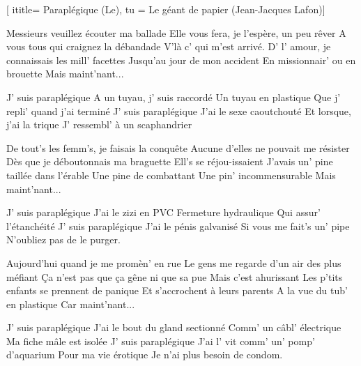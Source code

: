  [
ititle= {Paraplégique (Le)},
tu = {Le géant de papier (Jean-Jacques Lafon)}]


\beginverse
Messieurs veuillez écouter ma ballade
Elle vous fera, je l'espère, un peu rêver
A vous tous qui craignez la débandade
V'là c' qui m'est arrivé.
D' l' amour, je connaissais les mill' facettes
Jusqu'au jour de mon accident
En missionnair' ou en brouette
Mais maint'nant...
\endverse

\beginverse
J' suis paraplégique
A un tuyau, j' suis raccordé
Un tuyau en plastique
Que j' repli' quand j'ai terminé
J' suis paraplégique
J'ai le sexe caoutchouté
Et lorsque, j'ai la trique
J' ressembl' à un scaphandrier
\endverse

\beginverse
De tout's les femm's, je faisais la conquête
Aucune d'elles ne pouvait me résister
Dès que je déboutonnais ma braguette
Ell's se réjou-issaient
J'avais un' pine taillée dans l'érable
Une pine de combattant
Une pin' incommensurable
Mais maint'nant...
\endverse

\beginverse
J' suis paraplégique
J'ai le zizi en PVC
Fermeture hydraulique
Qui assur' l'étanchéité
J' suis paraplégique
J'ai le pénis galvanisé
Si vous me fait's un' pipe
N'oubliez pas de le purger.
\endverse

\beginverse
Aujourd'hui quand je me promèn' en rue
Le gens me regarde d'un air des plus méfiant
Ça n'est pas que ça gêne ni que sa pue
Mais c'est ahurissant
Les p'tits enfants se prennent de panique
Et s'accrochent à leurs parents
A la vue du tub' en plastique
Car maint'nant...
\endverse

\beginverse
J' suis paraplégique
J'ai le bout du gland sectionné
Comm' un câbl' électrique
Ma fiche mâle est isolée
J' suis paraplégique
J'ai l' vit comm' un' pomp' d'aquarium
Pour ma vie érotique
Je n'ai plus besoin de condom.
\endverse

\endsong